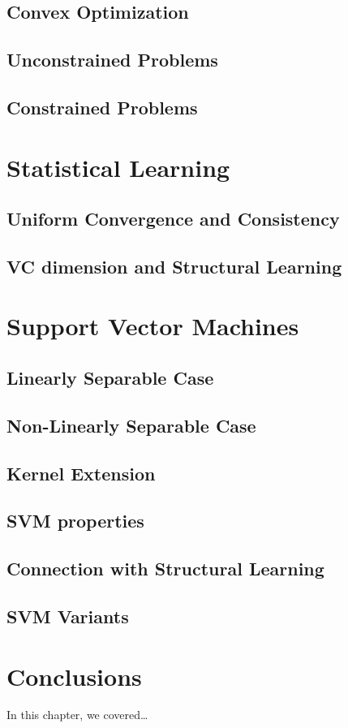 \subsection{Convex Optimization}
\subsection{Unconstrained Problems}
\subsection{Constrained Problems}


\section{Statistical Learning}
\subsection{Uniform Convergence and Consistency}
\subsection{VC dimension and Structural Learning}

\section{Support Vector Machines}
\subsection{Linearly Separable Case}
\subsection{Non-Linearly Separable Case}
\subsection{Kernel Extension}
\subsection{SVM properties}
\subsection{Connection with Structural Learning}
\subsection{SVM Variants}

\section{Conclusions}\label{sec-conclusions-1}

In this chapter, we covered\dots
